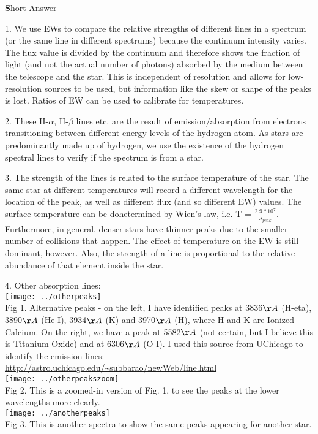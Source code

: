 \documentclass[12pt]{article}
\begin{document}
{\LARGE \textbf Short Answer}

1. We use EWs to compare the relative strengths of different lines in a spectrum (or the same line in different spectrums) because the continuum intensity varies. The flux value is divided by the continuum and therefore shows the fraction of light (and not the actual number of photons) absorbed by the medium between the telescope and the star. This is independent of resolution and allows for low-resolution sources to be used, but information like the skew or shape of the peaks is lost. Ratios of EW can be used to calibrate for temperatures.

2. These H-$\alpha$, H-$\beta$ lines etc. are the result of emission/absorption from electrons transitioning between different energy levels of the hydrogen atom. As stars are predominantly made up of hydrogen, we use the existence of the hydrogen spectral lines to verify if the spectrum is from a star.

3. The strength of the lines is related to the surface temperature of the star. The same star at different temperatures will record a different wavelength for the location of the peak, as well as different flux (and so different EW) values. The surface temperature can be dohetermined by Wien's law, i.e.
T = $ \frac{2.9*10^7}{\lambda_{peak}} $. Furthermore, in general, denser stars have thinner peaks due to the smaller number of collisions that happen. The effect of temperature on the EW is still dominant, however. Also, the strength of a line is proportional to the relative abundance of that element inside the star.

4. Other absorption lines: \\
\texttt{[image: ../otherpeaks]}\\
Fig 1. Alternative peaks - on the left, I have identified peaks at 3836$\AA$ (H-eta), 3890$\AA$ (He-I), 3934$\AA$ (K) and 3970$\AA$ (H), where H and K are Ionized Calcium.   On the right, we have a peak at 5582$\AA$ (not certain, but I believe this is Titanium Oxide) and at 6306$\AA$ (O-I). I used this source from UChicago to identify the emission lines: \url{http://astro.uchicago.edu/~subbarao/newWeb/line.html}\\
\texttt{[image: ../otherpeakszoom]}\\
Fig 2. This is a zoomed-in version of Fig. 1, to see the peaks at the lower wavelengths more clearly.\\
\texttt{[image: ../anotherpeaks]}\\
Fig 3. This is another spectra to show the same peaks appearing for another star.\\
\end{document}

